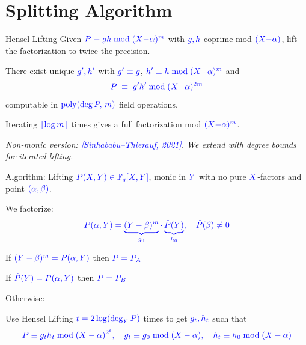 \documentclass[10pt,handout]{beamer}
\DeclareMathOperator{\poly}{poly}
\begin{document}
\section{Splitting Algorithm}
\begin{frame}{Hensel Lifting}
	Given $\textcolor{blue}{\textcolor{blue}{P \equiv gh \bmod{(X{-}\alpha)^m}}}$ with $\textcolor{blue}{\textcolor{blue}{g,h}}$ coprime mod $\textcolor{blue}{(X{-}\alpha)}$, lift the factorization to twice the precision.\pause

	\begin{theorem}[Hensel]
		There exist unique $\textcolor{blue}{\textcolor{blue}{g', h'}}$ with $\textcolor{blue}{\textcolor{blue}{g'\equiv g}}$, $\textcolor{blue}{\textcolor{blue}{h'\equiv h\bmod{(X{-}\alpha)^m}}}$ and
		$$\textcolor{blue}{\textcolor{blue}{P \;\equiv\; g'h' \bmod{(X{-}\alpha)^{2m}}}}$$
		computable in $\textcolor{blue}{\textcolor{blue}{\poly(\deg P,\, m)}}$ field operations.
	\end{theorem}\pause

	\vspace{0.3em}
	Iterating $\textcolor{blue}{\textcolor{blue}{\lceil\log m\rceil}}$ times gives a full factorization mod $\textcolor{blue}{\textcolor{blue}{(X{-}\alpha)^m}}$.

	\vspace{0.4em}
	\textit{Non-monic version: \textcolor{blue}{[Sinhababu--Thierauf, 2021]}. We extend with degree bounds for iterated lifting.}
\end{frame}
\begin{frame}{Algorithm: Lifting}
	$\textcolor{blue}{\textcolor{blue}{P(X,Y)\in\mathbb{F}_q[X,Y]}}$, monic in $\textcolor{blue}{\textcolor{blue}{Y}}$ with no pure $\textcolor{blue}{\textcolor{blue}{X}}$-factors and point $\textcolor{blue}{\textcolor{blue}{(\alpha,\beta)}}$.\pause

	We factorize:
	$$\textcolor{blue}{\textcolor{blue}{P(\alpha,Y)= \underbrace{(Y-\beta)^m}_{g_0}\cdot \underbrace{\hat{P}(Y)}_{h_0},\quad \hat{P}(\beta)\neq 0}}$$\pause

	If $\textcolor{blue}{\textcolor{blue}{(Y-\beta)^m=P(\alpha,Y)}}$ then $\textcolor{blue}{\textcolor{blue}{P=P_A}}$\pause

	If $\textcolor{blue}{\textcolor{blue}{\hat{P}(Y)=P(\alpha,Y)}}$ then $\textcolor{blue}{\textcolor{blue}{P=P_B}}$\pause

	Otherwise:

	Use Hensel Lifting $\textcolor{blue}{\textcolor{blue}{t=2\log(\deg_YP)}}$ times to get $\textcolor{blue}{\textcolor{blue}{g_t,h_t}}$ such that
	$$\textcolor{blue}{\textcolor{blue}{P\equiv g_t h_t \bmod{(X-\alpha)^{2^t}},\quad g_t\equiv g_0\bmod{(X-\alpha)},\quad h_t\equiv h_0\bmod{(X-\alpha)}}}$$
\end{frame}
\end{document}
